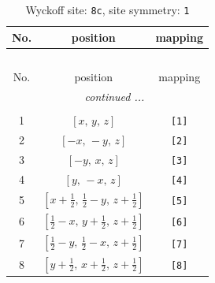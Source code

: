 \documentclass[fleqn,8pt]{jsarticle}
\begin{document}
\renewcommand{\arraystretch}{1.2}
\begin{longtable}{ccc}
\caption{Wyckoff site: {\tt 8c}, site symmetry: {\tt 1}}
 \\
 \hline \hline
No. & position & mapping \\ \hline \endfirsthead

\multicolumn{2}{l}{\tablename\ \thetable{}} \\
 \hline \hline
No. & position & mapping \\ \hline \endhead

 \hline \hline
\multicolumn{2}{r}{\footnotesize\it continued ...} \\ \endfoot

 \hline \hline
\multicolumn{2}{r}{} \\ \endlastfoot

1 & $\left[ x,\, y,\, z \right]$ & {\tt [1]} \\ \hline
2 & $\left[ - x,\, - y,\, z \right]$ & {\tt [2]} \\ \hline
3 & $\left[ - y,\, x,\, z \right]$ & {\tt [3]} \\ \hline
4 & $\left[ y,\, - x,\, z \right]$ & {\tt [4]} \\ \hline
5 & $\left[ x + \frac{1}{2},\, \frac{1}{2} - y,\, z + \frac{1}{2} \right]$ & {\tt [5]} \\ \hline
6 & $\left[ \frac{1}{2} - x,\, y + \frac{1}{2},\, z + \frac{1}{2} \right]$ & {\tt [6]} \\ \hline
7 & $\left[ \frac{1}{2} - y,\, \frac{1}{2} - x,\, z + \frac{1}{2} \right]$ & {\tt [7]} \\ \hline
8 & $\left[ y + \frac{1}{2},\, x + \frac{1}{2},\, z + \frac{1}{2} \right]$ & {\tt [8]} \\
\end{longtable}
\end{document}
